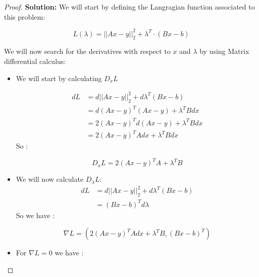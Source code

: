 \begin{proof}
    


\textbf{Solution:} We will start by defining the Langragian function associated to this problem:

\[
L(\lambda) = ||Ax-y||_2^2 + \lambda^T \cdot (Bx - b)
\]

We will now search for the derivatives with respect to $x$ and $\lambda$ by using Matrix differential calculus:
\begin{itemize}
    \item We will start by calculating $D_x L$
    
    \begin{align*}
    dL  &= d||Ax-y||_2^2+d\lambda^T (Bx-b)\\
        &= d(Ax-y)^T(Ax-y)+ \lambda^T B dx\\
        &= 2(Ax-y)^Td(Ax-y)+ \lambda^T B dx\\
        &= 2(Ax-y)^TAdx+ \lambda^T B dx
    \end{align*}
So :

\[
    D_x L = 2(Ax-y)^TA+\lambda^T B 
\]

\item We will now calculate $D_{\lambda}L$:
    \begin{align*}
        dL  &= d||Ax-y||_2^2+d\lambda^T (Bx-b)\\
            &=  (Bx-b)^Td\lambda
    \end{align*}
So we have :

 \[
     \nabla L = (2(Ax-y)^TAdx+ \lambda^T B , (Bx-b)^T)
\]
 
\item For $\nabla L = 0$ we have :


\end{itemize}
\end{proof}
